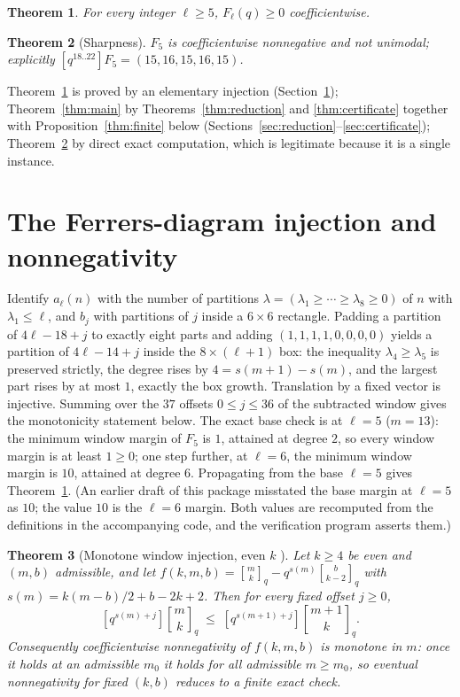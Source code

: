 \documentclass[11pt]{article}
\newtheorem{theorem}{Theorem}
\theoremstyle{definition}
\newcommand{\gauss}[2]{\genfrac{[}{]}{0pt}{0}{#1}{#2}_q}
\newcommand{\coeff}[1]{[q^{#1}]}
\begin{document}
\begin{theorem}\label{thm:nonneg}
For every integer $\ell\ge 5$, $F_\ell(q)\ge 0$ coefficientwise.
\end{theorem}

\begin{theorem}[Sharpness]\label{thm:sharp}
$F_5$ is coefficientwise nonnegative and not unimodal; explicitly
$\coeff{18..22}F_5=(15,16,15,16,15)$.
\end{theorem}

Theorem~\ref{thm:nonneg} is proved by an elementary injection (Section~\ref{sec:injection});
Theorem~\ref{thm:main} by Theorems~\ref{thm:reduction} and \ref{thm:certificate} together with
Proposition~\ref{thm:finite} below (Sections~\ref{sec:reduction}--\ref{sec:certificate});
Theorem~\ref{thm:sharp} by direct exact
computation, which is legitimate because it is a single instance.

\section{The Ferrers-diagram injection and nonnegativity}\label{sec:injection}

Identify $a_\ell(n)$ with the number of partitions $\lambda=(\lambda_1\ge\cdots\ge\lambda_8\ge0)$
of $n$ with $\lambda_1\le\ell$, and $b_j$ with partitions of $j$ inside a $6\times6$ rectangle.
Padding a partition of $4\ell-18+j$ to exactly eight parts and adding
$(1,1,1,1,0,0,0,0)$ yields a partition of $4\ell-14+j$ inside the $8\times(\ell+1)$ box: the
inequality $\lambda_4\ge\lambda_5$ is preserved strictly, the degree rises by $4=s(m+1)-s(m)$, and
the largest part rises by at most $1$, exactly the box growth. Translation by a fixed vector is
injective. Summing over the $37$ offsets $0\le j\le 36$ of the subtracted window gives the
monotonicity statement below. The exact base check is at $\ell=5$ ($m=13$): the minimum window
margin of $F_5$ is $1$, attained at degree $2$, so every window margin is at least $1\ge0$; one step
further, at $\ell=6$, the minimum window margin is $10$, attained at degree $6$. Propagating from
the base $\ell=5$ gives Theorem~\ref{thm:nonneg}. (An earlier draft of this package misstated the
base margin at $\ell=5$ as $10$; the value $10$ is the $\ell=6$ margin. Both values are recomputed
from the definitions in the accompanying code, and the verification program asserts them.)

\begin{theorem}[Monotone window injection, even $k$ \cite{sz}]\label{thm:injection}
Let $k\ge4$ be even and $(m,b)$ admissible, and let
$f(k,m,b)=\gauss{m}{k}-q^{s(m)}\gauss{b}{k-2}$ with
$s(m)=k(m-b)/2+b-2k+2$. Then for every fixed offset $j\ge0$,
\[
  \coeff{s(m)+j}\gauss{m}{k}\;\le\;\coeff{s(m+1)+j}\gauss{m+1}{k}.
\]
Consequently coefficientwise nonnegativity of $f(k,m,b)$ is monotone in $m$: once it holds at an
admissible $m_0$ it holds for all admissible $m\ge m_0$, so eventual nonnegativity for fixed
$(k,b)$ reduces to a finite exact check.
\end{theorem}
\end{document}
